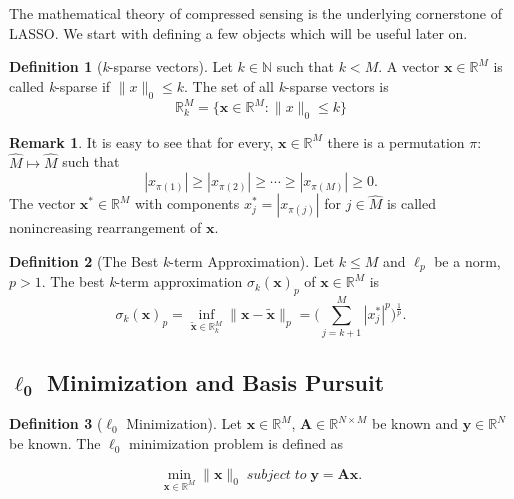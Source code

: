\documentclass[11pt,oneside,czech,american]{book} %
\theoremstyle{definition} %
\theoremstyle{definition}
\newtheorem{defn}{Definition}
\newtheorem{rmrk}{Remark}
\begin{document}
The mathematical theory of compressed sensing is the underlying cornerstone of LASSO. We start with defining a few objects which will be useful later on.
\begin{defn}[\emph{k}-sparse vectors]
	Let $k \in \mathbb{N}$ such that $k<M$. A vector $\bm{x} \in \mathbb{R}^{M}$ is called \emph{k}-sparse if $\lVert x\rVert_{0} \leq k$. The set of all \emph{k}-sparse vectors is
	\begin{equation}
		\mathbb{R}_{k}^{M} = \{ \bm{x} \in \mathbb{R}^{M} : \lVert x\rVert_{0} \leq k\} \label{ksparse}
	\end{equation}
\end{defn}

\begin{rmrk}
	It is easy to see that for every, $\bm{x} \in \mathbb{R}^{M}$ there is a permutation $\pi$: $\hat{M} \mapsto \hat{M}$ such that
	\begin{equation}
		|x_{\pi(1)}|\geq |x_{\pi(2)}|\geq \cdots \geq|x_{\pi(M)}|\geq 0.
	\end{equation}
	The vector $\bm{x}^* \in \mathbb{R}^{M}$ with components $x_{j}^*=|x_{\pi(j)}|$ for $j \in \hat{M}$ is called nonincreasing rearrangement of $\bm{x}$.
\end{rmrk}

\begin{defn}[The Best \emph{k}-term Approximation]
	Let $k \leq M$ and $\ell_{p}$ be a norm, $p>1$. The best \emph{k}-term approximation $\sigma_k (\bm{x})_p$ of $\bm{x} \in \mathbb{R}^{M}$ is
	\begin{equation}
		\sigma_k (\bm{x})_p = \inf_{\bm{\tilde{x}} \in \mathbb{R}^{M}_k}\lVert \bm{x}-\bm{\tilde{x}}\rVert_{p} = \Big(\sum_{j=k+1}^{M}|{x}^{*}_j|^{p}\Big)^{ \frac{1}{p}}.
		\label{best_k_term}
	\end{equation}
\end{defn}

\subsection*{$\bm{\ell_{0}}$ Minimization and Basis Pursuit}

\begin{defn}[$\ell_{0}$ Minimization]
	Let $\bm{x} \in \mathbb{R}^{M}$, $\bm{A} \in \mathbb{R}^{N \times M}$ be known and $\bm{y} \in \mathbb{R}^{N}$ be known. The $\ell_{0}$ minimization problem is defined as
	
	\begin{equation}
		\min_{\bm{{x}} \in \mathbb{R}^{M}}\lVert \bm{x}\rVert_{0} \;subject\; to\; \bm{y} = \bm{A} \bm{x}. \label{l0}
	\end{equation}
\end{defn}
\end{document}
